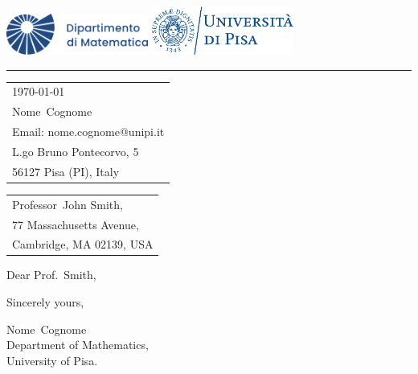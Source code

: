 \documentclass{article}
\makeatletter
\newcommand{\nome}{Nome}
\newcommand{\cognome}{Cognome}
\newcommand{\email}{nome.cognome@unipi.it}
\makeatother
\begin{document}

\includegraphics[width=0.35\textwidth]{matematica_dx_blu}
\hfill 
\includegraphics[width=0.35\textwidth]{marchio_unipi_orizz_pant541}

\vspace{-1em} %

\rule{\linewidth}{.5pt} %

\bigskip\bigskip %


\hfill
\begin{tabular}{l @{}}
\hfill \today \bigskip\\ %
\hfill \nome\ \cognome \\
\hfill Email: \email \\
\hfill L.go Bruno Pontecorvo, 5 \\
\hfill 56127 Pisa (PI), Italy \\
\end{tabular}

\bigskip %


\begin{tabular}{@{} l}
	Professor\ John Smith, \\
	77 Massachusetts Avenue, \\
    Cambridge, MA 02139, USA
\end{tabular}

\bigskip

Dear Prof.\ Smith,

\bigskip


\lipsum[1-2]

\bigskip %

Sincerely yours,

\vspace{20pt} %

\nome\ \cognome\\ 
Department of Mathematics, \\
University of Pisa. 
\end{document}

